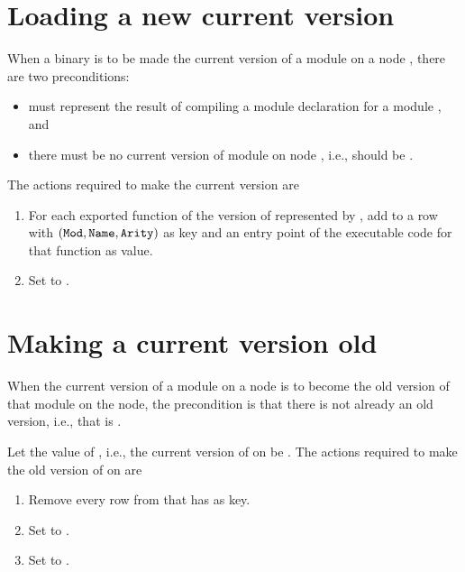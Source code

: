 \section{Loading a new current version}

\label{section:making-current-version}

When a binary  is to be made the current version of a module 
on a node , there are two preconditions:
\begin{itemize}
\item {} must represent the result of compiling a module declaration for
a module , and
\item there must be no current version of module  on node , i.e.,
 should be .
\end{itemize}
The actions required to make  the current version are
\begin{enumerate}
\item For each exported function  of the version
of  represented by , add to  a
row with $(\TZ{Mod},\TZ{Name},\linebreak[0]\TZ{Arity})$ as key and an
entry point of the executable code for that function as value.
\item Set  to .
\end{enumerate}

\section{Making a current version old}

\label{section:making-old-version}

When the current version of a module  on a node  is to become the
old version of that module on the node, the precondition is that there is
not already an old version, i.e., that 
 is .

Let the value of
, i.e.,
the current version of  on  be .
The actions required to make  the old version of  on  are
\begin{enumerate}
\item Remove every row from
 that has  as key.
\item Set  to .
\item Set  to .
\end{enumerate}

